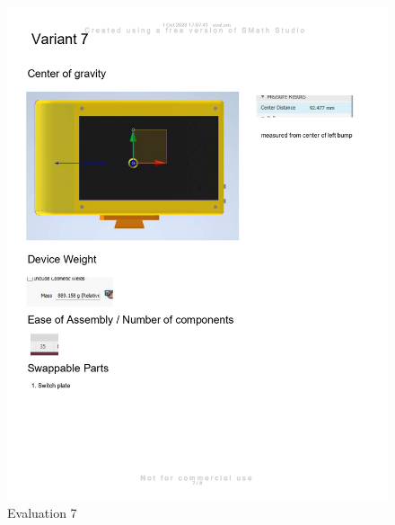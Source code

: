 \begin{figure}[H]
    \centering
    \includegraphics[width=\linewidth]{texs/appendix/data/evaluation/eval_page-0007.jpg}
    \caption{Evaluation 7}
    \label{fig:evaluation-7}
\end{figure}


